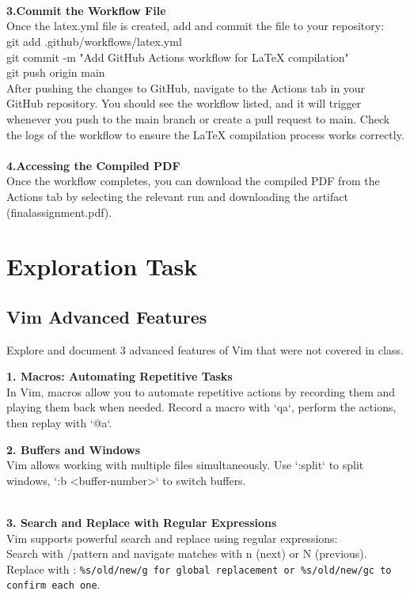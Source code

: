 \documentclass[a4paper,12pt]{article}
\begin{document}
\\
\\
\\\textbf{3.Commit the Workflow File}
\\Once the latex.yml file is created, add and commit the file to your repository:  
\\git add .github/workflows/latex.yml
\\git commit -m "Add GitHub Actions workflow for LaTeX compilation"
\\git push origin main
\\After pushing the changes to GitHub, navigate to the Actions tab in your GitHub repository.
You should see the workflow listed, and it will trigger whenever you push to the main branch or create a pull request to main.
Check the logs of the workflow to ensure the LaTeX compilation process works correctly.
\\
\\\textbf{4.Accessing the Compiled PDF}
\\Once the workflow completes, you can download the compiled PDF from the Actions tab by selecting the relevant run and downloading the artifact (finalassignment.pdf).

\clearpage
\section{Exploration Task}
\subsection{Vim Advanced Features}
Explore and document 3 advanced features of Vim that were not covered in class.

\textbf{1. Macros: Automating Repetitive Tasks}
\\In Vim, macros allow you to automate repetitive actions by recording them and playing them back when needed. Record a macro with `qa`, perform the actions, then replay with `@a`.

\textbf{2. Buffers and Windows}
\\Vim allows working with multiple files simultaneously. Use `:split` to split windows, `:b <buffer-number>` to switch buffers.

\\\textbf{3. Search and Replace with Regular Expressions}
\\Vim supports powerful search and replace using regular expressions:
\\Search with /pattern and navigate matches with n (next) or N (previous).
Replace with :
\texttt{\%s/old/new/g for global replacement or \%s/old/new/gc to confirm each one}.
\end{document}
